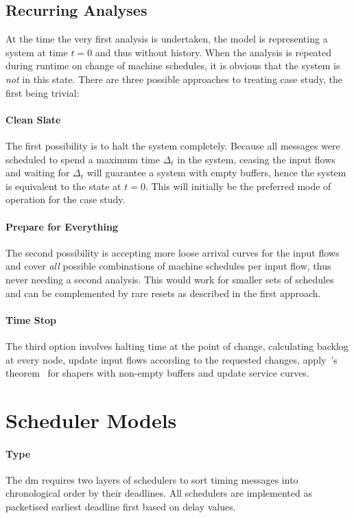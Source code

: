 \subsection{Recurring Analyses} 
At the time the very first analysis is undertaken, the model is representing a system at time $t=0$ and thus without history.
When the analysis is repeated during runtime on change of machine schedules, it is obvious that the system is \emph{not} in this state. 
There are three possible approaches to treating case study, the first being trivial:
\paragraph{Clean Slate} The first possibility is to halt the system completely. Because all messages were scheduled to spend a maximum time $\Delta_t$ in the system,
ceasing the input flows and waiting for $\Delta_t$ will guarantee a system with empty buffers, hence the system is equivalent to the state at $t=0$. This will initially be the preferred mode of operation for the case study.
\paragraph{Prepare for Everything} The second possibility is accepting more loose arrival curves for the input flows and cover \emph{all} possible combinations of machine schedules
per input flow, thus never needing a second analysis. This would work for smaller sets of schedules and can be complemented by rare resets as described in the first approach.
\paragraph{Time Stop} The third option involves halting time at the point of change, calculating backlog at every node, update input flows according
to the requested changes,  apply~\citeauthor{thiran_network_2001}'s theorem~\cite[p. 225]{thiran_network_2001} for shapers with non-empty buffers and update service curves.

\section{Scheduler Models}

\paragraph{Type}
The \gls{dm} requires two layers of schedulers to sort timing messages into chronological order by their deadlines.
All schedulers are implemented as packetised earliest deadline first based on delay values.
